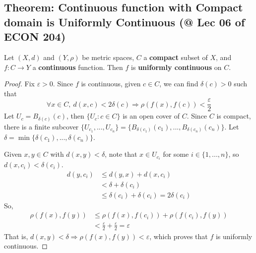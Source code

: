 \documentclass[11pt]{elegantbook}
\begin{document}
\subsection{Theorem: Continuous function with Compact domain is Uniformly Continuous \small{(@ Lec 06 of ECON 204)}}
\begin{theorem}
    Let $(X, d)$ and $(Y, \rho)$ be metric spaces, $C$ a \textbf{compact} subset of $X$, and $f : C \rightarrow Y$ a \textbf{continuous} function. Then $f$ is \textbf{uniformly continuous} on $C$.
\end{theorem}
\begin{proof}
    Fix $\varepsilon>0$. Since $f$ is continuous, given $c\in C$, we can find $\delta(c)>0$ such that $$\forall x\in C,\ d(x,c)<2\delta(c) \Rightarrow \rho(f(x),f(c))<\frac{\varepsilon}{2}$$
    Let $U_c=B_{\delta(c)}(c)$, then $\{U_c:c\in C\}$ is an open cover of $C$. Since $C$ is compact, there is a finite subcover $\{U_{c_1},...,U_{c_n}\}=\{B_{\delta(c_1)}(c_1),...,B_{\delta(c_n)}(c_n)\}$. Let $\delta=\min\{\delta(c_1),...,\delta(c_n)\}$.
    
    Given $x,y\in C$ with $d(x,y)<\delta$, note that $x\in U_{c_i}$ for some $i\in\{1,...,n\}$, so $d(x,c_i)<\delta(c_i)$.
    \begin{equation}
        \begin{aligned}
            d(y,c_i)&\leq d(y,x)+d(x,c_i)\\
            &<\delta+\delta(c_i)\\
            &\leq\delta(c_i)+\delta(c_i)=2\delta(c_i)
        \end{aligned}
        \nonumber
    \end{equation}
    So,
    \begin{equation}
        \begin{aligned}
            \rho(f(x),f(y))&\leq \rho(f(x),f(c_i))+\rho(f(c_i),f(y))\\
            &<\frac{\varepsilon}{2}+\frac{\varepsilon}{2}=\varepsilon
        \end{aligned}
        \nonumber
    \end{equation}
    That is, $d(x,y)<\delta \Rightarrow \rho(f(x),f(y))<\varepsilon$, which proves that $f$ is uniformly continuous.
\end{proof}
\end{document}
